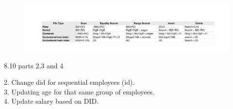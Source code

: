 \begin{problem}{8.6}
  \begin{solution}
    \begin{figure}[H]
      \centering
      \includegraphics[scale=0.65]{problem_8_6.pdf}
    \end{figure}
  \end{solution}
\end{problem}

\begin{problem}{8.10 parts 2,3 and 4}
  \begin{solution}
    2. Change did for sequential employees (id).\\
    3. Updating age for that same group of employees.\\
    4. Update salary based on DID.
  \end{solution}
\end{problem}

\begin{problem}{12.2}
\end{problem}

\begin{problem}{12.4}
\end{problem}

\begin{problem}{12.6}
\end{problem}



